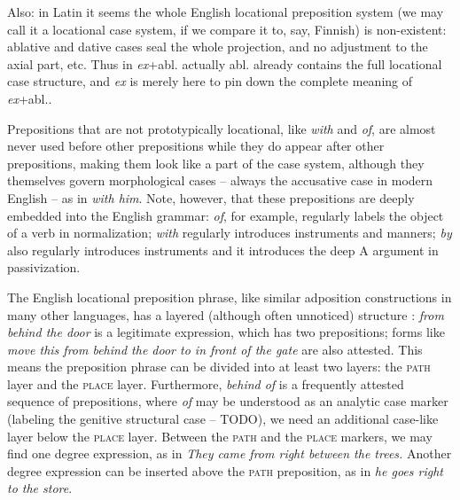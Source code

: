 \documentclass[UTF8, a4paper, oneside, scheme=plain, 12pt]{ctexbook}
\newcommand{\form}[1]{\emph{#1}}
\newcommand{\category}[1]{\textsc{#1}}
\begin{document}
Also: in Latin it seems the whole English locational preposition system 
(we may call it a locational case system, if we compare it to, say, Finnish)
is non-existent: ablative and dative cases seal the whole projection, 
and no adjustment to the axial part, etc.
Thus in \form{ex}+abl. actually abl. already contains the full locational case structure,
and \form{ex} is merely here to pin down the complete meaning of \form{ex}+abl..

Prepositions that are not prototypically locational, 
like \form{with} and \form{of}, are almost never used 
before other prepositions 
while they do appear after other prepositions,
making them look like a part of the case system, 
although they themselves govern morphological cases -- 
always the accusative case in modern English --
as in \form{with him}.
Note, however, that these prepositions are deeply embedded into the English grammar:
\form{of}, for example, regularly labels the object 
of a verb in normalization;
\form{with} regularly introduces instruments and manners; 
\form{by} also regularly introduces instruments 
and it introduces the deep A argument in passivization.


The English locational preposition phrase, 
like similar adposition constructions in many other languages, 
has a layered (although often unnoticed) structure \citep{spatialpp}:
\form{from behind the door} is a legitimate expression, which has two prepositions;
forms like \form{move this from behind the door to in front of the gate}
are also attested.
This means the preposition phrase can be divided into at least two layers:
the \category{path} layer and the \category{place} layer.
Furthermore, \form{behind of} is a frequently attested sequence of prepositions,
where \form{of} may be understood as an analytic case marker
(labeling the genitive structural case -- TODO), 
we need an additional case-like layer below the \category{place} layer.
Between the \category{path} and the \category{place} markers, 
we may find one degree expression, as in 
\form{They came from right between the trees.}
Another degree expression can be inserted above the \category{path} preposition,
as in \form{he goes right to the store}.
\end{document}
